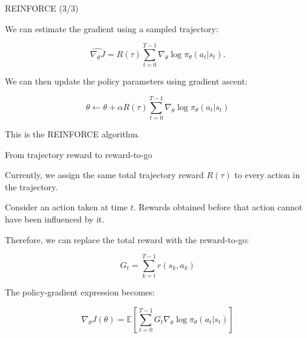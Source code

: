 \documentclass{beamer}
\begin{document}
\begin{frame}{REINFORCE (3/3)}
	\begin{flushleft}
		
		We can estimate the gradient using a sampled trajectory:
		
		\[
		\widehat{\nabla_\theta J}
		=
		R(\tau)
		\sum_{t=0}^{T-1}
		\nabla_\theta\log\pi_\theta(a_t|s_t).
		\]
		
		We can then update the policy parameters using
		gradient ascent:
		
		\[
		\boxed{
			\theta
			\leftarrow
			\theta+
			\alpha R(\tau)
			\sum_{t=0}^{T-1}
			\nabla_\theta\log\pi_\theta(a_t|s_t)
		}
		\]
		
		This is the REINFORCE algorithm.
		
	\end{flushleft}
\end{frame}



\begin{frame}{From trajectory reward to reward-to-go}
	\begin{flushleft}
		
		Currently, we assign the same total trajectory reward
		$R(\tau)$ to every action in the trajectory.
		
		Consider an action taken at time $t$.
		Rewards obtained before that action cannot have been
		influenced by it.
		
		Therefore, we can replace the total reward with
		the reward-to-go:
		
		\[
		\boxed{
			G_t=\sum_{k=t}^{T-1}r(s_k,a_k)
		}
		\]
		
		The policy-gradient expression becomes:
		
		\[
		\boxed{
			\nabla_\theta J(\theta)
			=
			\mathbb{E}
			\left[
			\sum_{t=0}^{T-1}
			G_t\nabla_\theta\log\pi_\theta(a_t|s_t)
			\right]
		}
		\]
		
	\end{flushleft}
\end{frame}
\end{document}
